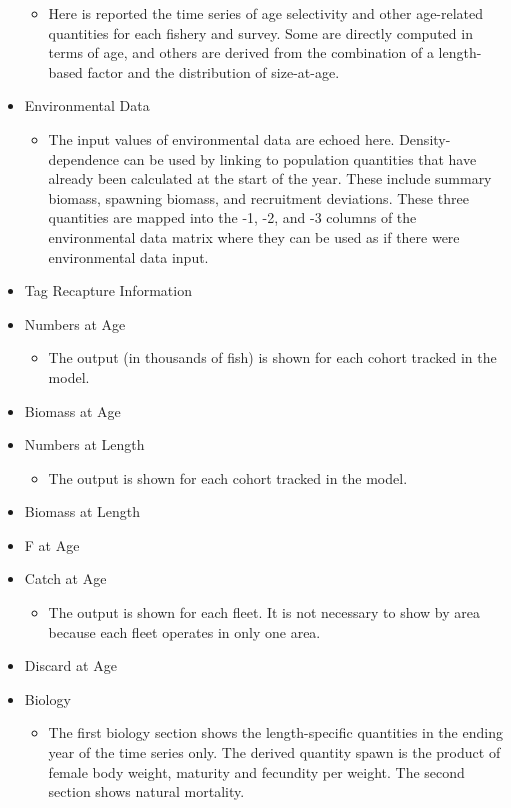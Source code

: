 \begin{itemize}
\begin{itemize}
		\item Here is reported the time series of age selectivity and other age-related quantities for each fishery and survey. Some are directly computed in terms of age, and others are derived from the combination of a length-based factor and the distribution of size-at-age.
	\end{itemize}
	\item Environmental Data
	\begin{itemize}
		\item The input values of environmental data are echoed here. Density-dependence can be used by linking to population quantities that have already been calculated at the start of the year. These include summary biomass, spawning biomass, and recruitment deviations. These three quantities are mapped into the -1, -2, and -3 columns of the environmental data matrix where they can be used as if there were environmental data input. 
	\end{itemize}
	\item Tag Recapture Information
	\item Numbers at Age
	\begin{itemize}
		\item The output (in thousands of fish) is shown for each cohort tracked in the model.
	\end{itemize}
	\item Biomass at Age
	\item Numbers at Length
	\begin{itemize}
		\item The output is shown for each cohort tracked in the model.
	\end{itemize}
	\item Biomass at Length
	\item F at Age
	\item Catch at Age
	\begin{itemize}
		\item The output is shown for each fleet. It is not necessary to show by area because each fleet operates in only one area.
	\end{itemize}
	\item Discard at Age
	\item Biology
	\begin{itemize}
		\item The first biology section shows the length-specific quantities in the ending year of the time series only. The derived quantity spawn is the product of female body weight, maturity and fecundity per weight. The second section shows natural mortality.

\end{itemize}
\end{itemize}
